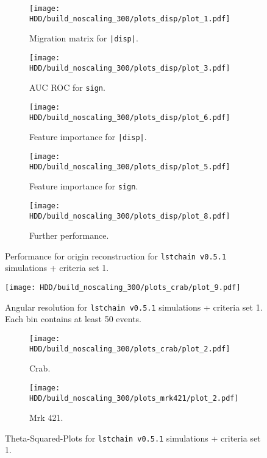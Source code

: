 \begin{figure}
    \centering
    \begin{subfigure}{0.49\textwidth}
        \centering
        \texttt{[image: HDD/build\_noscaling\_300/plots\_disp/plot\_1.pdf]}
        \caption{Migration matrix for \texttt{|disp|}.}
    \end{subfigure}
    \hfill
    \begin{subfigure}{0.49\textwidth}
        \centering
        \texttt{[image: HDD/build\_noscaling\_300/plots\_disp/plot\_3.pdf]}
        \caption{AUC ROC for \texttt{sign}.}
    \end{subfigure}
    \newline\vfill
    \begin{subfigure}{0.49\textwidth}
        \centering
        \texttt{[image: HDD/build\_noscaling\_300/plots\_disp/plot\_6.pdf]}
        \caption{Feature importance for \texttt{|disp|}.}
    \end{subfigure}
    \hfill
    \begin{subfigure}{0.49\textwidth}
        \centering
        \texttt{[image: HDD/build\_noscaling\_300/plots\_disp/plot\_5.pdf]}
        \caption{Feature importance for \texttt{sign}.}
    \end{subfigure}
    \newline\vfill
    \begin{subfigure}{0.49\textwidth}
        \centering
        \texttt{[image: HDD/build\_noscaling\_300/plots\_disp/plot\_8.pdf]}
        \caption{Further performance.}
    \end{subfigure}
    \caption{Performance for origin reconstruction for \texttt{lstchain v0.5.1} simulations + criteria set 1.}
    \label{fig:origin_oldMC_300}
\end{figure}

\begin{figure}
    \centering
    \texttt{[image: HDD/build\_noscaling\_300/plots\_crab/plot\_9.pdf]}
    \caption{Angular resolution for \texttt{lstchain v0.5.1} simulations + criteria set 1.
        Each bin contains at least 50 events.
    }
    \label{fig:ang_res_oldMC_300}
\end{figure}

\begin{figure}
    \centering
    \begin{subfigure}{0.49\textwidth}
        \centering
        \texttt{[image: HDD/build\_noscaling\_300/plots\_crab/plot\_2.pdf]}
        \caption{Crab.}
        \label{fig:crab_oldMC_300}
    \end{subfigure}
    \hfill
    \begin{subfigure}{0.49\textwidth}
        \centering
        \texttt{[image: HDD/build\_noscaling\_300/plots\_mrk421/plot\_2.pdf]}
        \caption{Mrk 421.}
        \label{fig:mrk_oldMC_300}
    \end{subfigure}
    \caption{Theta-Squared-Plots for \texttt{lstchain v0.5.1} simulations + criteria set 1.}
    \label{fig:obs_oldMC_300}
\end{figure}



